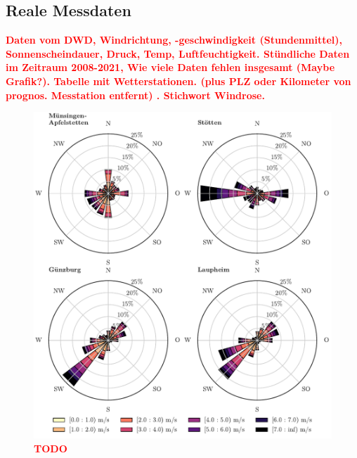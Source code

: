 \documentclass[
12pt, %
toc=listofnumbered, %
toc=chapterentrydotfill, %
numbers=noenddot, %
captions=tableheading, %
]{scrreprt}
\let\Oldsubsection\subsection
\renewcommand{\subsection}{\FloatBarrier\Oldsubsection}
\newcommand{\highlight}[1]{\textbf{\textcolor{red}{#1}}}
\begin{document}
\subsection{Reale Messdaten}
\highlight{Daten vom DWD, Windrichtung, -geschwindigkeit (Stundenmittel), Sonnenscheindauer, Druck, Temp, Luftfeuchtigkeit. 
Stündliche Daten im Zeitraum 2008-2021, Wie viele Daten fehlen insgesamt (Maybe Grafik?). 
Tabelle mit Wetterstationen. (plus PLZ oder Kilometer von prognos. Messtation entfernt) . 
Stichwort Windrose.}

\begin{figure}[tph]
	\begin{center}
		\includegraphics[]{./images/windroses.pdf}
		\caption{\highlight{{TODO}}}
		\label{fig:windroses}
	\end{center}
\end{figure}
\end{document}
